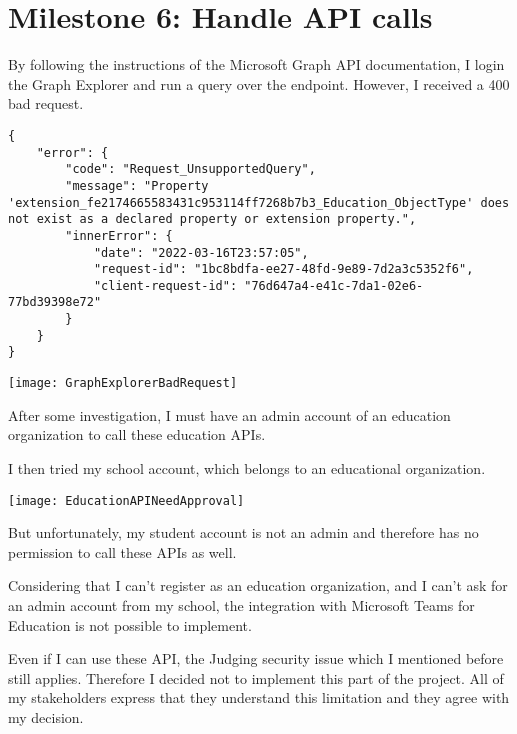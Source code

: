 \documentclass[report.tex]{subfiles}
\begin{document}
\section{Milestone 6: Handle API calls}

By following the instructions of the Microsoft Graph API documentation\cite{microsoft:docs:education-overview}, I login the Graph Explorer\cite{microsoft:graph-explorer} and run a  query over the  endpoint. However, I received a 400 bad request.

\begin{verbatim}
{
    "error": {
        "code": "Request_UnsupportedQuery",
        "message": "Property 'extension_fe2174665583431c953114ff7268b7b3_Education_ObjectType' does not exist as a declared property or extension property.",
        "innerError": {
            "date": "2022-03-16T23:57:05",
            "request-id": "1bc8bdfa-ee27-48fd-9e89-7d2a3c5352f6",
            "client-request-id": "76d647a4-e41c-7da1-02e6-77bd39398e72"
        }
    }
}
\end{verbatim}

\texttt{[image: GraphExplorerBadRequest]}

After some investigation, I must have an admin account of an education organization to call these education APIs.

I then tried my school account, which belongs to an educational organization.

\texttt{[image: EducationAPINeedApproval]}

But unfortunately, my student account is not an admin and therefore has no permission to call these APIs as well.

Considering that I can't register as an education organization, and I can't ask for an admin account from my school, the integration with Microsoft Teams for Education is not possible to implement.

Even if I can use these API, the Judging security issue which I mentioned before still applies. Therefore I decided not to implement this part of the project. All of my stakeholders express that they understand this limitation and they agree with my decision.
\end{document}
